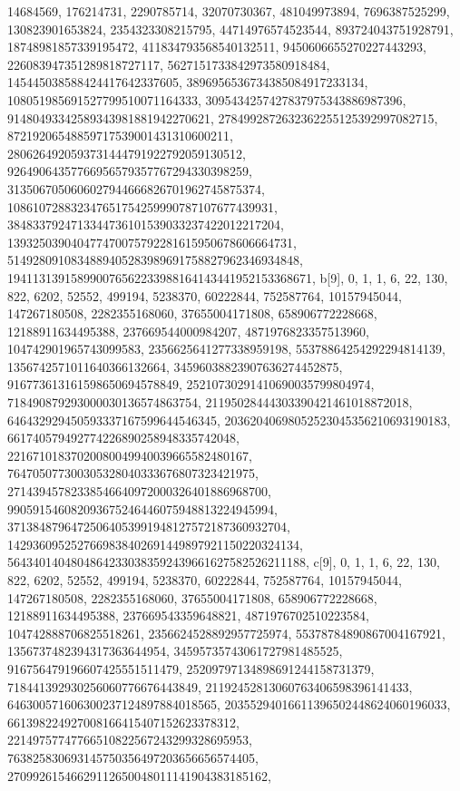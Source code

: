 {{{   14684569, 176214731, 2290785714, 32070730367, 481049973894, 7696387525299, 
   130823901653824, 2354323308215795, 44714976574523544, 893724043751928791, 
   18748981857339195472, 411834793568540132511, 9450606655270227443293, 
   226083947351289818727117, 5627151733842973580918484, 
   145445038588424417642337605, 3896956536734385084917233134, 
   108051985691527799510071164333, 3095434257427837975343886987396, 
   91480493342589343981881942270621, 2784992872632362255125392997082715, 
   87219206548859717539001431310600211, 
   2806264920593731444791922792059130512, 
   92649064357766956579357767294330398259, 
   3135067050606027944666826701962745875374, 
   108610728832347651754259990787107677439931, 
   3848337924713344736101539033237422012217204, 
   139325039040477470075792281615950678606664731, 
   5149280910834889405283989691758827962346934848, 
   194113139158990076562233988164143441952153368671}}, 
 {b[9], {0, 1, 1, 6, 22, 130, 822, 6202, 52552, 499194, 5238370, 60222844, 
   752587764, 10157945044, 147267180508, 2282355168060, 37655004171808, 
   658906772228668, 12188911634495388, 237669544000984207, 
   4871976823357513960, 104742901965743099583, 2356625641277338959198, 
   55378864254292294814139, 1356742571011640366132664, 
   34596038823907636274452875, 916773613161598650694578849, 
   25210730291410690035799804974, 718490879293000030136574863754, 
   21195028444303390421461018872018, 646432929450593337167599644546345, 
   20362040698052523045356210693190183, 661740579492774226890258948335742048, 
   22167101837020080049940039665582480167, 
   764705077300305328040333676807323421975, 
   27143945782338546640972000326401886968700, 
   990591546082093675246446075948813224945994, 
   37138487964725064053991948127572187360932704, 
   1429360952527669838402691449897921150220324134, 
   56434014048048642330383592439661627582526211188}}, 
 {c[9], {0, 1, 1, 6, 22, 130, 822, 6202, 52552, 499194, 5238370, 60222844, 
   752587764, 10157945044, 147267180508, 2282355168060, 37655004171808, 
   658906772228668, 12188911634495388, 237669543359648821, 
   4871976702510223584, 104742888706825518261, 2356624528892957725974, 
   55378784890867004167921, 1356737482394317363644954, 
   34595735743061727981485525, 916756479196607425551511479, 
   25209797134898691244158731379, 718441392930256060776676443849, 
   21192452813060763406598396141433, 646300571606300237124897884018565, 
   20355294016611396502448624060196033, 661398224927008166415407152623378312, 
   22149757747766510822567243299328695953, 
   763825830693145750356497203656656574405, 
   27099261546629112650048011141904383185162, 
}}}
